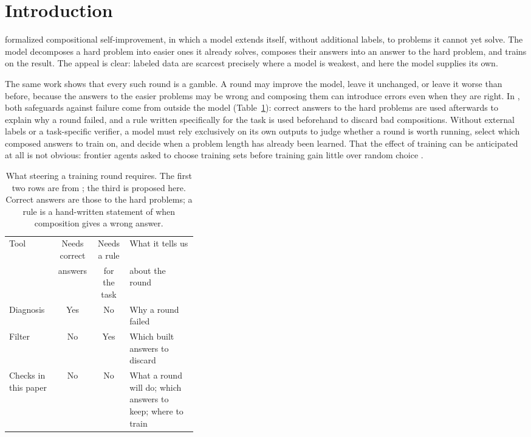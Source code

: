 \section{Introduction}

\citet{shin2026compositional} formalized compositional self-improvement, in
which a model extends itself, without additional labels, to problems it cannot
yet solve. The model decomposes a hard problem into easier ones it already
solves, composes their answers into an answer to the hard problem, and trains
on the result. The appeal is clear: labeled data are scarcest precisely where a
model is weakest, and here the model supplies its own.

The same work shows that every such round is a gamble. A round may improve the
model, leave it unchanged, or leave it worse than before, because the answers
to the easier problems may be wrong and composing them can introduce errors
even when they are right. In \citet{shin2026compositional}, both safeguards
against failure come from outside the model (Table~\ref{tab:tools}): correct
answers to the hard problems are used afterwards to explain why a round failed,
and a rule written specifically for the task is used beforehand to discard bad
compositions. Without external labels or a task-specific verifier, a model must
rely exclusively on its own outputs to judge whether a round is worth running,
select which composed answers to train on, and decide when a problem length has
already been learned. That the effect of training can be anticipated at all is
not obvious: frontier agents asked to choose training sets before training gain
little over random choice \citep{zhang2026datasense}.

\begin{table}[t]
  \caption{What steering a training round requires. The first two rows are from
  \citet{shin2026compositional}; the third is proposed here. Correct answers
  are those to the hard problems; a rule is a hand-written statement of when
  composition gives a wrong answer.}
  \label{tab:tools}
  \centering
  \begin{tabular}{@{}lcc>{\raggedright\arraybackslash}p{0.36\linewidth}@{}}
    \toprule
    Tool & Needs correct & Needs a rule & What it tells us \\
         & answers       & for the task & about the round \\
    \midrule
    Diagnosis & Yes & No  & Why a round failed \\
    Filter    & No  & Yes & Which built answers to discard \\
    Checks in this paper & No & No & What a round will do; which answers to keep; where to train \\
    \bottomrule
  \end{tabular}
\end{table}

